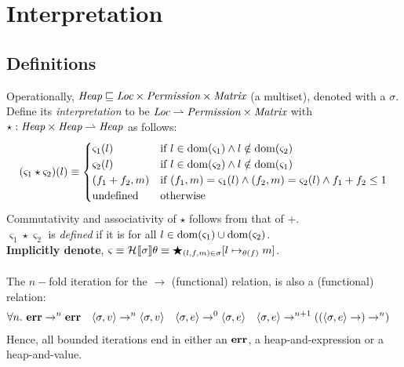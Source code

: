 \section{Interpretation}

\subsection{Definitions}


Operationally, $\emph{Heap} \sqsubseteq \emph{Loc} \times \emph{Permission}
\times \emph{Matrix} $ (a multiset), denoted with a $\sigma$.\\
Define its \emph{interpretation} to be $\emph{Loc} \rightharpoonup
\emph{Permission} \times \emph{Matrix}$ with $\star:
\emph{Heap} \times \emph{Heap} \rightharpoonup \emph{Heap}$ as follows:
\[
    (\varsigma_1 \star \varsigma_2)(l) \equiv
    \begin{cases}
        \varsigma_1(l) & \textrm{if } l \in \mathrm{dom}(\varsigma_1) \wedge l \notin \mathrm{dom}(\varsigma_2) \\
        \varsigma_2(l) & \textrm{if } l \in \mathrm{dom}(\varsigma_2) \wedge l \notin \mathrm{dom}(\varsigma_1) \\
        (f_1 + f_2, m) & \textrm{if } (f_1, m) = \varsigma_1(l) \wedge (f_2, m) = \varsigma_2(l) \wedge f_1 + f_2 \leq 1 \\
        \textrm{undefined} & \textrm{otherwise}
    \end{cases}
\]
Commutativity and associativity of $\star$ follows from that of $+$.\\
$\varsigma_1 \star \varsigma_2$ is \emph{defined} if it is for all $l \in
\mathrm{dom}(\varsigma_1) \cup \mathrm{dom}(\varsigma_2)$.\\
\textbf{Implicitly denote}, $\varsigma \equiv \mathcal{H}_{} [\![ \sigma ]\!]\theta \equiv
\bigstar_{(l,f,m) \in \sigma} [ l \mapsto_{\theta(f)} m ]$.\\
\\
The $n-$fold iteration for the $\rightarrow$ (functional) relation, is also a (functional) relation:
\begin{align*}
    \forall n.\ \mathbf{err} &\rightarrow^n \mathbf{err} &
    \langle \sigma , v \rangle &\rightarrow^n \langle \sigma , v \rangle &
    \langle \sigma , e \rangle &\rightarrow^0 \langle \sigma , e \rangle &
    \langle \sigma , e \rangle &\rightarrow^{n+1} ((\langle \sigma , e \rangle \rightarrow) \rightarrow^n)
\end{align*}
Hence, all bounded iterations end in either an $\mathbf{err}$, a heap-and-expression or a
heap-and-value.

